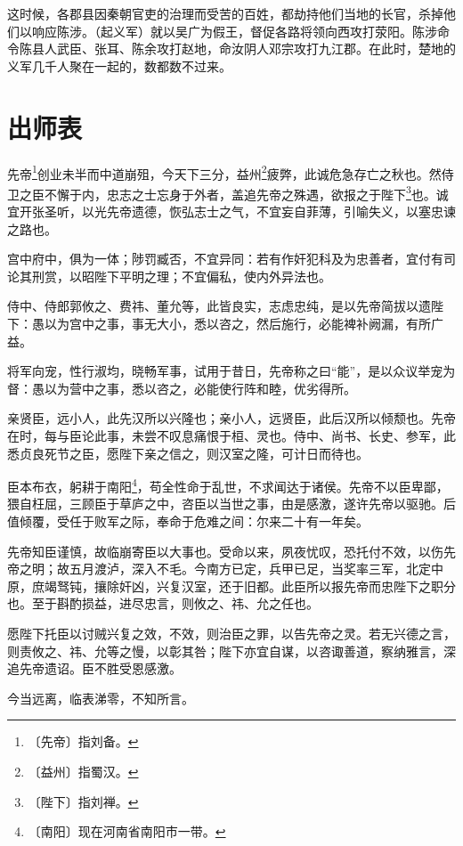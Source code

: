 \documentclass[12pt,UTF-8,openany,a4]{ctexbook}
\begin{document}
\begin{large}
    这时候，各郡县因秦朝官吏的治理而受苦的百姓，都劫持他们当地的长官，杀掉他们以响应陈涉。（起义军）就以吴广为假王，督促各路将领向西攻打荥阳。陈涉命令陈县人武臣、张耳、陈余攻打赵地，命汝阴人邓宗攻打九江郡。在此时，楚地的义军几千人聚在一起的，数都数不过来。
    
\end{large}



\chapter{出师表}

\begin{large}
    
    先帝\footnote{〔先帝〕\yiwen 指刘备。}创业未半而中道崩殂，今天下三分，益州\footnote{〔益州〕\yiwen 指蜀汉。}疲弊，此诚危急存亡之秋也。然侍卫之臣不懈于内，忠志之士忘身于外者，盖追先帝之殊遇，欲报之于陛下\footnote{〔陛下〕\yiwen 指刘禅。}也。诚宜开张圣听，以光先帝遗德，恢弘志士之气，不宜妄自菲薄，引喻失义，以塞忠谏之路也。
    
    宫中府中，俱为一体；陟罚臧否，不宜异同：若有作奸犯科及为忠善者，宜付有司论其刑赏，以昭陛下平明之理；不宜偏私，使内外异法也。
    
    侍中、侍郎郭攸之、费祎、董允等，此皆良实，志虑忠纯，是以先帝简拔以遗陛下：愚以为宫中之事，事无大小，悉以咨之，然后施行，必能裨补阙漏，有所广益。
    
    将军向宠，性行淑均，晓畅军事，试用于昔日，先帝称之曰“能”，是以众议举宠为督：愚以为营中之事，悉以咨之，必能使行阵和睦，优劣得所。
    
    亲贤臣，远小人，此先汉所以兴隆也；亲小人，远贤臣，此后汉所以倾颓也。先帝在时，每与臣论此事，未尝不叹息痛恨于桓、灵也。侍中、尚书、长史、参军，此悉贞良死节之臣，愿陛下亲之信之，则汉室之隆，可计日而待也。
    
    臣本布衣，躬耕于南阳\footnote{〔南阳〕\yiwen 现在河南省南阳市一带。}，苟全性命于乱世，不求闻达于诸侯。先帝不以臣卑鄙，猥自枉屈，三顾臣于草庐之中，咨臣以当世之事，由是感激，遂许先帝以驱驰。后值倾覆，受任于败军之际，奉命于危难之间：尔来二十有一年矣。
    
    先帝知臣谨慎，故临崩寄臣以大事也。受命以来，夙夜忧叹，恐托付不效，以伤先帝之明；故五月渡泸，深入不毛。今南方已定，兵甲已足，当奖率三军，北定中原，庶竭驽钝，攘除奸凶，兴复汉室，还于旧都。此臣所以报先帝而忠陛下之职分也。至于斟酌损益，进尽忠言，则攸之、祎、允之任也。
    
    愿陛下托臣以讨贼兴复之效，不效，则治臣之罪，以告先帝之灵。若无兴德之言，则责攸之、祎、允等之慢，以彰其咎；陛下亦宜自谋，以咨诹善道，察纳雅言，深追先帝遗诏。臣不胜受恩感激。
    
    今当远离，临表涕零，不知所言。
\end{large}
\end{document}
